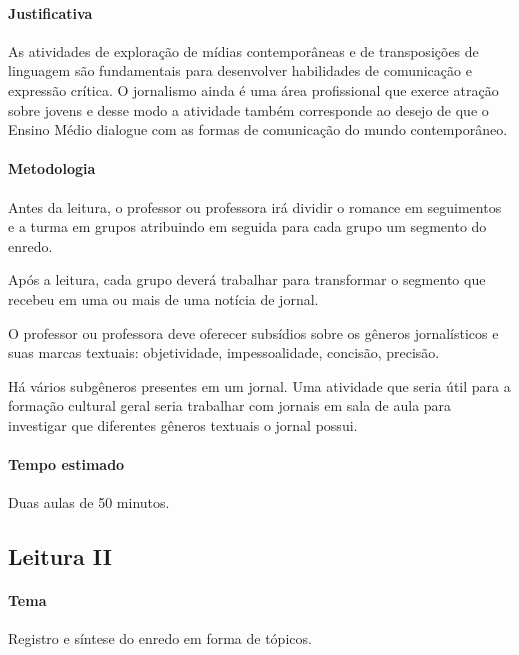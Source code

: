 \documentclass[12pt]{extarticle}
\begin{document}
\paragraph{Justificativa}
As atividades de exploração de mídias contemporâneas e de transposições
de linguagem são fundamentais para desenvolver habilidades de
comunicação e expressão crítica. O jornalismo ainda é uma área
profissional que exerce atração sobre jovens e desse modo a atividade
também corresponde ao desejo de que o Ensino Médio dialogue com as
formas de comunicação do mundo contemporâneo.


\paragraph{Metodologia}
Antes da leitura, o professor ou professora irá dividir o romance em
seguimentos e a turma em grupos atribuindo em seguida para cada grupo um
segmento do enredo.

Após a leitura, cada grupo deverá trabalhar para transformar o segmento
que recebeu em uma ou mais de uma notícia de jornal.

O professor ou professora deve oferecer subsídios sobre os gêneros
jornalísticos e suas marcas textuais: objetividade, impessoalidade,
concisão, precisão.

Há vários subgêneros presentes em um jornal. Uma atividade que seria
útil para a formação cultural geral seria trabalhar com jornais em sala
de aula para investigar que diferentes gêneros textuais o jornal possui.

\paragraph{Tempo estimado} Duas aulas de 50 minutos.

\subsection{Leitura II}


\paragraph{Tema} Registro e síntese do enredo em forma de tópicos.
\end{document}
